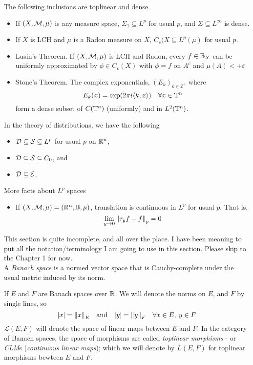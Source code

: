 \documentclass[../main-v2-manifolds.tex]{subfiles}
\begin{document}
\begin{lemma}
    The following inclusions are toplinear and dense.
    \begin{itemize}
        \item If $(X,\mathcal{M},\mu)$ is any measure space, $\Sigma_1\subseteq L^p$ for usual $p$, and $\Sigma\subseteq L^\infty$ is dense.
        \item If $X$ is LCH and $\mu$ is a Radon measure on $X$, $C_c(X\subseteq L^p(\mu)$ for usual $p$.
        \item Lusin's Theorem. If $(X,\mathcal{M},\mu)$ is LCH and Radon, every $f\in{\mathbb{B}}_X$ can be uniformly approximated by $\phi\in C_c(X)$ with $\phi=f$ on $A^c$ and $\mu(A)<+\varepsilon$
        \item Stone's Theorem. The complex exponentials, $(E_k)_{k\in\mathbb{Z}^n}$ where
        \[
            E_k(x) = \operatorname{exp}(2\pi i\langle k,x\rangle)\quad\forall x\in{\mathbb{T}^n}
        \]
        form a dense subset of $C({\mathbb{T}^n})$ (uniformly) and in $L^2({\mathbb{T}^n})$.
    \end{itemize}
    In the theory of distributions, we have the following
    \begin{itemize}
        \item $\mathcal{D}\subseteq\mathcal{S}\subseteq L^p$ for usual $p$ on ${\mathbb{R}^n}$, 
        \item $\mathcal{D}\subseteq\mathcal{S}\subseteq C_0$, and
        \item $\mathcal{D}\subseteq\mathcal{E}$.
    \end{itemize}
\end{lemma}
More facts about $L^p$ spaces
\begin{itemize}
    \item If $(X,\mathcal{M},\mu) = ({\mathbb{R}^n},{\mathbb{B}},\mu)$, translation is continuous in $L^p$ for usual $p$. That is,
    \[
        \lim_{y\to 0}\norm{\tau_y f-f}_p = 0
    \]
\end{itemize}
%
%
\newpage
{}
This section is quite incomplete, and all over the place. I have been meaning to put all the notation/terminology I am going to use in this section. Please skip to the Chapter 1 for now.\\

%
A \emph{Banach space} is a normed vector space that is Cauchy-complete under the usual metric induced by its norm. 

If $E$ and $F$ are Banach spaces over $\mathbb{R}$. We will denote the norms on $E$, and $F$ by single lines, so 
\[
    \vert x\vert = \norm{x}_E \qqtext{and} \vert y\vert = \norm{y}_F\quad\forall x\in E,\: y\in F
\]
$\mathcal{L}(E,F)$ will denote the space of linear maps between $E$ and $F$. In the category of Banach spaces, the space of morphisms are called \emph{toplinear morphisms} - or \emph{CLM}s (\emph{continuous linear maps}); which we will denote by $L(E,F)$ for toplinear morphisms bewteen $E$ and $F$. \\
\end{document}
